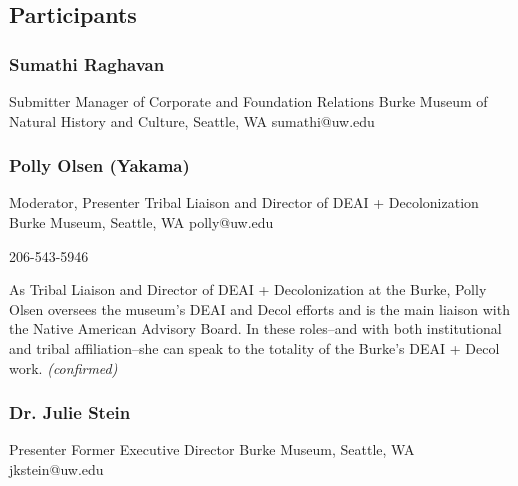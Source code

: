 \documentclass{report}
\begin{document}
            \subsection*{Participants}
              \subsubsection*{ Sumathi Raghavan }
              Submitter\newline
              Manager of Corporate and Foundation Relations\newline
              Burke Museum of Natural History and Culture, Seattle, WA
              \newline
              sumathi@uw.edu\newline
              
              

              


              
                \subsubsection*{ Polly Olsen (Yakama) }
                Moderator, Presenter\newline
                Tribal Liaison and Director of DEAI + Decolonization\newline
                Burke Museum, Seattle, WA
                \newline
                polly@uw.edu\newline
                
                206-543-5946\newline

                As Tribal Liaison and Director of DEAI + Decolonization at the Burke, Polly Olsen oversees the museum’s DEAI and Decol efforts and is the main liaison with the Native American Advisory Board. In these roles--and with both institutional and tribal affiliation--she can speak to the totality of the Burke's DEAI + Decol work.\newline
                \emph{ (confirmed) }
              

              
                \subsubsection*{ Dr. Julie Stein }
                Presenter\newline
                Former Executive Director\newline
                Burke Museum, Seattle, WA
                \newline
                jkstein@uw.edu\newline
                
\end{document}
